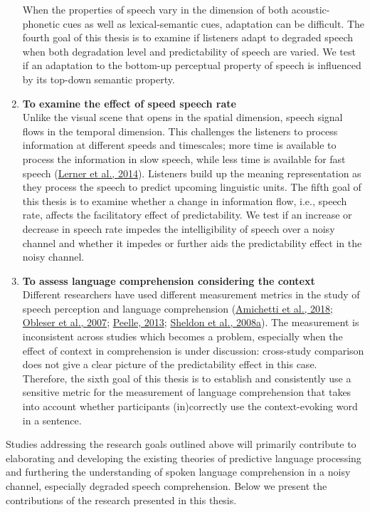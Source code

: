 \documentclass[a4paper, nobind]{templates/ociamthesis}
\begin{document}
\begin{enumerate}
  When the properties of speech vary in the dimension of both acoustic-phonetic cues as well as lexical-semantic cues,
  adaptation can be difficult.
  The fourth goal of this thesis is to examine if listeners adapt to degraded speech when both degradation level and predictability of speech are varied.
  We test if an adaptation to the bottom-up perceptual property of speech is influenced by its top-down semantic property.
\item
  \textbf{To examine the effect of speed speech rate}\\
  Unlike the visual scene that opens in the spatial dimension, speech signal flows in the temporal dimension.
  This challenges the listeners to process information at different speeds and timescales;
  more time is available to process the information in slow speech, while less time is available for fast speech (\protect\hyperlink{ref-Lerner2014}{Lerner et al., 2014}).
  Listeners build up the meaning representation as they process the speech to predict upcoming linguistic units.
  The fifth goal of this thesis is to examine whether a change in information flow, i.e., speech rate, affects the facilitatory effect of predictability.
  We test if an increase or decrease in speech rate impedes the intelligibility of speech over a noisy channel
  and whether it impedes or further aids the predictability effect in the noisy channel.
\item
  \textbf{To assess language comprehension considering the context}\\
  Different researchers have used different measurement metrics in the study of speech perception and language comprehension (\protect\hyperlink{ref-Amichetti2018}{Amichetti et al., 2018}; \protect\hyperlink{ref-Obleser2007}{Obleser et al., 2007}; \protect\hyperlink{ref-Peelle2013}{Peelle, 2013}; \protect\hyperlink{ref-Sheldon2008a}{Sheldon et al., 2008a}).
  The measurement is inconsistent across studies which becomes a problem, especially when the effect of context in comprehension is under discussion:
  cross-study comparison does not give a clear picture of the predictability effect in this case.
  Therefore, the sixth goal of this thesis is to establish and consistently use a sensitive metric for the measurement of language comprehension that takes into account whether participants (in)correctly use the context-evoking word in a sentence.
\end{enumerate}

Studies addressing the research goals outlined above will primarily contribute to elaborating and developing the existing theories of predictive language processing and furthering the understanding of spoken language comprehension in a noisy channel, especially degraded speech comprehension.
Below we present the contributions of the research presented in this thesis.
\end{document}
